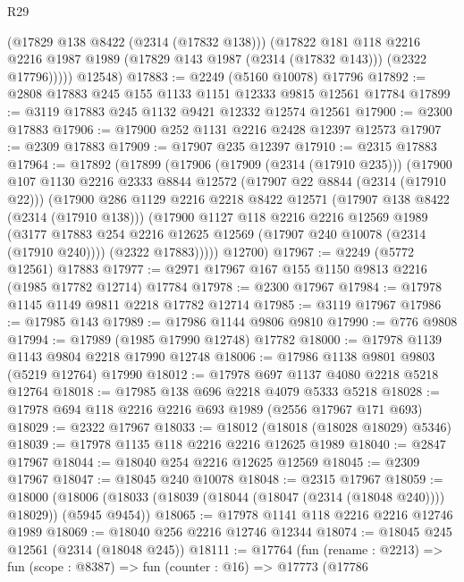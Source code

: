 \begin{lexlean}{R29}
\begin{coremodule}
            (@17829 @138 @8422 (@2314 (@17832 @138)))
            (@17822
              @181
              @118
              @2216
              @2216
              @1987
              @1989
              (@17829 @143 @1987 (@2314 (@17832 @143)))
              (@2322 @17796)))))
      @12548)
@17883 := @2249 (@5160 @10078) @17796
@17892 := @2808 @17883 @245 @155 @1133 @1151 @12333 @9815 @12561 @17784
@17899 := @3119 @17883 @245 @1132 @9421 @12332 @12574 @12561
@17900 := @2300 @17883
@17906 := @17900 @252 @1131 @2216 @2428 @12397 @12573
@17907 := @2309 @17883
@17909 := @17907 @235 @12397
@17910 := @2315 @17883
@17964 := @17892
    (@17899
      (@17906
        (@17909 (@2314 (@17910 @235)))
        (@17900
          @107
          @1130
          @2216
          @2333
          @8844
          @12572
          (@17907 @22 @8844 (@2314 (@17910 @22)))
          (@17900
            @286
            @1129
            @2216
            @2218
            @8422
            @12571
            (@17907 @138 @8422 (@2314 (@17910 @138)))
            (@17900
              @1127
              @118
              @2216
              @2216
              @12569
              @1989
              (@3177 @17883 @254 @2216 @12625 @12569 (@17907 @240 @10078 (@2314 (@17910 @240))))
              (@2322 @17883)))))
      @12700)
@17967 := @2249 (@5772 @12561) @17883
@17977 := @2971 @17967 @167 @155 @1150 @9813 @2216 (@1985 @17782 @12714) @17784
@17978 := @2300 @17967
@17984 := @17978 @1145 @1149 @9811 @2218 @17782 @12714
@17985 := @3119 @17967
@17986 := @17985 @143
@17989 := @17986 @1144 @9806 @9810
@17990 := @776 @9808
@17994 := @17989 (@1985 @17990 @12748) @17782
@18000 := @17978 @1139 @1143 @9804 @2218 @17990 @12748
@18006 := @17986 @1138 @9801 @9803 (@5219 @12764) @17990
@18012 := @17978 @697 @1137 @4080 @2218 @5218 @12764
@18018 := @17985 @138 @696 @2218 @4079 @5333 @5218
@18028 := @17978 @694 @118 @2216 @2216 @693 @1989 (@2556 @17967 @171 @693)
@18029 := @2322 @17967
@18033 := @18012 (@18018 (@18028 @18029) @5346)
@18039 := @17978 @1135 @118 @2216 @2216 @12625 @1989
@18040 := @2847 @17967
@18044 := @18040 @254 @2216 @12625 @12569
@18045 := @2309 @17967
@18047 := @18045 @240 @10078
@18048 := @2315 @17967
@18059 := @18000
    (@18006 (@18033 (@18039 (@18044 (@18047 (@2314 (@18048 @240)))) @18029)) (@5945 @9454))
@18065 := @17978 @1141 @118 @2216 @2216 @12746 @1989
@18069 := @18040 @256 @2216 @12746 @12344
@18074 := @18045 @245 @12561 (@2314 (@18048 @245))
@18111 := @17764
    (fun (rename : @2213) =>
    fun (scope : @8387) =>
    fun (counter : @16) =>
    @17773
      (@17786

\end{coremodule}
\end{lexlean}
